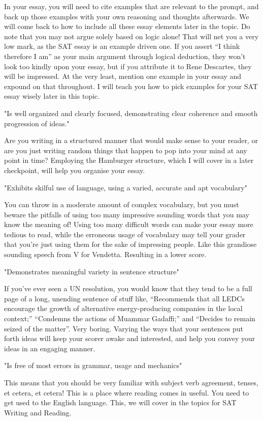 \documentclass[DIV=calc,11pt,parskip,numbers=noenddot]{scrartcl} %
\begin{document}
In your essay, you will need to cite examples that are relevant to the prompt, and back up those examples with your own reasoning and thoughts afterwards. We will come back to how to include all these essay elements later in the topic. Do note that you may not argue solely based on logic alone! That will net you a very low mark, as the SAT essay is an example driven one. If you assert “I think therefore I am” as your main argument through logical deduction, they won’t look too kindly upon your essay, but if you attribute it to Rene Descartes, they will be impressed. At the very least, mention one example in your essay and expound on that throughout. I will teach you how to pick examples for your SAT essay wisely later in this topic.

"Is well organized and clearly focused, demonstrating clear coherence and smooth progression of ideas."

Are you writing in a structured manner that would make sense to your reader, or are you just writing random things that happen to pop into your mind at any point in time? Employing the Hamburger structure, which I will cover in a later checkpoint, will help you organise your essay.

"Exhibits skilful use of language, using a varied, accurate and apt vocabulary"

You can throw in a moderate amount of complex vocabulary, but you must beware the pitfalls of using too many impressive sounding words that you may know the meaning of! Using too many difficult words can make your essay more tedious to read, while the erroneous usage of vocabulary may tell your grader that you’re just using them for the sake of impressing people. Like this grandiose sounding speech from V for Vendetta. Resulting in a lower score.

"Demonstrates meaningful variety in sentence structure"

If you’ve ever seen a UN resolution, you would know that they tend to be a full page of a long, unending sentence of stuff like, “Recommends that all LEDCs encourage the growth of alternative energy-producing companies in the local context;” “Condemns the actions of Muammar Gadaffi;” and “Decides to remain seized of the matter”. Very boring. Varying the ways that your sentences put forth ideas will keep your scorer awake and interested, and help you convey your ideas in an engaging manner.

"Is free of most errors in grammar, usage and mechanics"

This means that you should be very familiar with subject verb agreement, tenses, et cetera, et cetera! This is a place where reading comes in useful. You need to get used to the English language. This, we will cover in the topics for SAT Writing and Reading.
\end{document}
